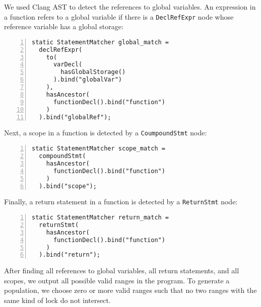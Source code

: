 We used Clang AST to detect the references to global variables. An expression in a function refers to a global variable if there is a \verb|DeclRefExpr| node whose reference variable has a global storage:

\begin{lstlisting}[frame=tb, xleftmargin=2em, framexleftmargin=1.5em, numbers=left]
static StatementMatcher global_match =
  declRefExpr(
    to(
      varDecl(
        hasGlobalStorage()
      ).bind("globalVar")
    ),
    hasAncestor(
      functionDecl().bind("function")
    )
  ).bind("globalRef");
  \end{lstlisting}

Next, a scope in a function is detected by a \verb|CoumpoundStmt| node:

\begin{lstlisting}[frame=tb, xleftmargin=2em, framexleftmargin=1.5em, numbers=left]
static StatementMatcher scope_match =
  compoundStmt(
    hasAncestor(
      functionDecl().bind("function")
    )
  ).bind("scope");
\end{lstlisting}

Finally, a return statement in a function is detected by a \verb|ReturnStmt| node:

\begin{lstlisting}[frame=tb, xleftmargin=2em, framexleftmargin=1.5em, numbers=left]
static StatementMatcher return_match =
  returnStmt(
    hasAncestor(
      functionDecl().bind("function")
    )
  ).bind("return");
\end{lstlisting}

After finding all references to global variables, all return statements, and all scopes, we output all possible valid ranges in the program. To generate a population, we choose zero or more valid ranges such that no two ranges with the same kind of lock do not intersect.